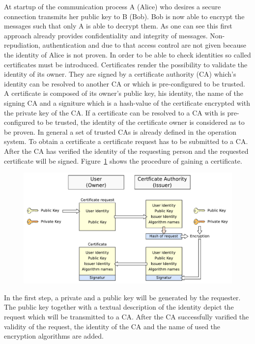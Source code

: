 At startup of the communication process A (Alice) who desires a secure connection transmits her public key to B (Bob).
Bob is now able to encrypt the messages such that only A is able to decrypt them.
As one can see this first approach already provides confidentiality and integrity of messages.
%
Non-repudiation, authentication and due to that access control are not given because the identity of Alice is not proven.
In order to be able to check identities so called certificates must be introduced.
Certificates render the possibility to validate the identity of its owner. They are signed by a certificate authority (CA) which's identity can be resolved to another CA or which is  pre-configured to be trusted.
A certificate is composed of its owner's public key, his identity, the name of the signing CA and a signiture which is a hash-value of the certificate encrypted with the private key of the CA. 
If a certificate can be resolved to a CA with is pre-configured to be trusted, the identity of the certificate owner is considered as to be proven. 
In general a set of trusted CAs is already defined in the operation system.
To obtain a certificate a certificate request has to be submitted to a CA.
After the CA has verified the identity of the requesting person and the requested certificate will be signed.
Figure~\ref{fig:certificate_request} shows the procedure of gaining a certificate.
\begin{figure}[htb]
	\centering%
 	\includegraphics[width=13cm]{tex_tls_echoservice/certificates.pdf}
	\label{fig:certificate_request}
\end{figure}
In the first step, a private and a public key will be generated by the requester. The public key together with a textual description of the identity  depict the request which will be transmitted to a CA. After the CA successfully varified the validity of the request, the identity of the CA and the name of used the encryption algorithms are added.
